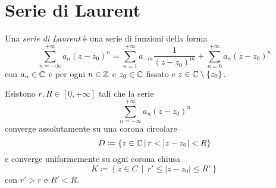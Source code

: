 \chapter{Serie di Laurent}

\begin{definition}
  Una \emph{serie di Laurent} è una serie di funzioni della forma 
  \begin{equation*}
    \sum_{n=-\infty}^{+\infty} a_n(z-z_0)^n = \sum_{n=1}^{+\infty} a_{-m}
            \frac{1}{(z-z_0)^m} + \sum_{n=0}^{+\infty} a_n(z - z_0)^{n}
  \end{equation*}
con $a_n \in \mathbb{C}$ e per ogni $n \in \mathbb{Z}$ e $z_0 \in \mathbb{C}$ fissato e $z\in \mathbb{C}
\setminus \left\{ z_0 \right\}$.
  \label{def:serie_laurent}
\end{definition}

\begin{proposition}
  Esistono $r, R \in \left[ 0, +\infty \right]$ tali che la serie 
  \begin{equation*}
    \sum_{n=-\infty}^{+\infty} a_n(z-z_0)^n
  \end{equation*}
  converge assolutamente su una corona circolare 
  \begin{equation*}
    D \coloneqq \left\{ z \in \mathbb{C} \,\middle|\, r < |z-z_0| < R \right\}
  \end{equation*}
  e converge uniformemente su ogni corona chiusa
  \begin{equation*}
    K \coloneqq \left\{ z \in C \,\middle|\, r' \le |z-z_0| \le R' \right\}
  \end{equation*}
  con $r' > r$ e $R' < R$.
  \label{prp:convergenza_ass_unif_laurent}
\end{proposition}
